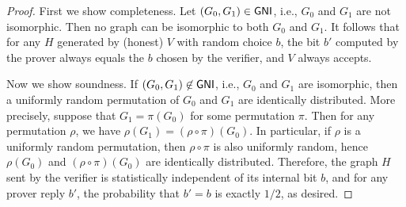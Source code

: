 \documentclass[11pt]{article}
\begin{document}
\begin{proof}
  First we show completeness.  Let $(G_{0}, G_{1}) \in \mathsf{GNI}$, i.e.,
  $G_0$ and $G_1$ are not isomorphic.  Then no graph can be isomorphic
  to both $G_0$ and $G_1$.  It follows that for any $H$ generated by
  (honest) $V$ with random choice $b$, the bit $b'$ computed by the
  prover always equals the $b$ chosen by the verifier, and $V$ always
  accepts.
  
  Now we show soundness.  If $(G_0, G_{1}) \not\in \mathsf{GNI}$, i.e.,
  $G_{0}$ and $G_1$ are isomorphic, then a uniformly random
  permutation of $G_{0}$ and $G_{1}$ are identically distributed.
  More precisely, suppose that $G_{1} = \pi(G_{0})$ for some
  permutation $\pi$.  Then for any permutation $\rho$, we have
  $\rho(G_{1}) = (\rho \circ \pi)(G_{0})$.  In particular, if $\rho$
  is a uniformly random permutation, then $\rho \circ \pi$ is also
  uniformly random, hence $\rho(G_{0})$ and $(\rho \circ \pi)(G_{0})$
  are identically distributed.  Therefore, the graph $H$ sent by the
  verifier is statistically independent of its internal bit $b$, and
  for any prover reply $b'$, the probability that $b' = b$ is exactly
  $1/2$, as desired.
\end{proof}
\end{document}
